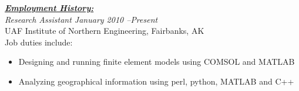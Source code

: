 \documentclass[10pt, letterpaper]{article}
\renewcommand{\section}[1]{\bigskip\Large\textbf{\underline{\textit{#1}}}\normalsize\\} %
\begin{document}
\begin{comment}
Suggested by Lisa's dad, but not by Career Services.
I think this is largely irrelevant due to my possession of a bachelors degree.
\large\textit{High School Diploma \hfill May 2005}\normalsize \\
Susitna Valley Junior Senior High School\\
\emph{Graduated with a 3.73 GPA}

New section, trying it out
Currently canning this section but THAT'S OKAY
\section*{\underline{\textit{Projects:}}}
\large\textit{Super Four-Bar Explorer \hfill December 2008}\normalsize
\small\begin{itemize}
\item A program written in python that uses a Gauss-Newton unconstrained optimization algorithm to fit the path traced by a four bar linkage to a given set of points
\item Accompanied by a spreadsheet that illustrates four-bar linkage traced paths
\end{itemize}\normalsize\medskip

Another new section, recommended by Career Services. At worst, I have the
wording for it, amirite?
\section*{\underline{\textit{Service:}}}
\tiny\begin{enumerate}
\item Administered the web site and Facebook page for ASME's UAF student chapter \hfill 2009--2010
\item Volunteered at the UAF College of Engineering and Mines' Engineer's Week Open House \hfill February 2010
\end{enumerate}\normalsize

\large\textit{Society of Automotive Engineers, UAF
Chapter\hfill2009}\normalsize\\
\textit{Treasurer}
\end{comment}

\section{Employment History:}

\large\textit{Research Assistant \hfill January 2010 --Present}\normalsize \\
UAF Institute of Northern Engineering, Fairbanks, AK\\
Job duties include:
\small\begin{itemize}
\item Designing and running finite element models using COMSOL and MATLAB
\item Analyzing geographical information using perl, python, MATLAB and C++
\end{itemize}\normalsize\medskip
\end{document}
